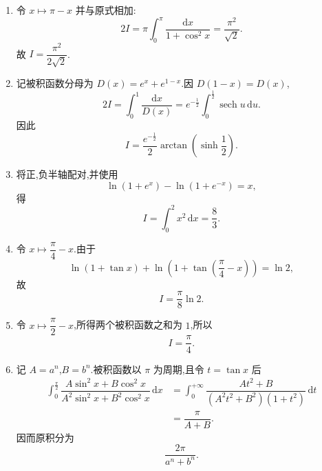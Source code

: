 \begin{solution}
    \leavevmode
    \begin{enumerate}
        \item 令 $x\mapsto\pi-x$ 并与原式相加:
              \[
                  2I=\pi\int_0^\pi\dfrac{\mathrm{d}x}{1+\cos^2x}
                  =\dfrac{\pi^2}{\sqrt2}.
              \]
              故 $I=\boxed{\dfrac{\pi^2}{2\sqrt2}}$.

        \item 记被积函数分母为 $D(x)=e^x+e^{1-x}$.因 $D(1-x)=D(x)$,
              \[
                  2I=\int_0^1\dfrac{\mathrm{d}x}{D(x)}
                  =e^{-\frac{1}{2}}\int_0^{\frac{1}{2}}\operatorname{sech}u\,\mathrm{d}u.
              \]
              因此
              \[
                  I=\boxed{\dfrac{e^{-\frac{1}{2}}}{2}
                      \arctan\left(\sinh\dfrac{1}{2}\right)}.
              \]

        \item 将正,负半轴配对,并使用
              \[
                  \ln(1+e^x)-\ln(1+e^{-x})=x,
              \]
              得
              \[
                  I=\int_0^2x^2\,\mathrm{d}x=\boxed{\dfrac{8}{3}}.
              \]

        \item 令 $x\mapsto\dfrac{\pi}{4}-x$.由于
              \[
                  \ln(1+\tan x)
                  +\ln\left(1+\tan\left(\dfrac{\pi}{4}-x\right)\right)=\ln2,
              \]
              故
              \[
                  I=\boxed{\dfrac{\pi}{8}\ln2}.
              \]

        \item 令 $x\mapsto\dfrac{\pi}{2}-x$,所得两个被积函数之和为 $1$,所以
              \[
                  I=\boxed{\dfrac{\pi}{4}}.
              \]

        \item 记 $A=a^n$,$B=b^n$.被积函数以 $\pi$ 为周期,且令 $t=\tan x$ 后
              \[
                  \begin{aligned}
                      \int_0^{\frac{\pi}{2}}
                      \dfrac{A\sin^2x+B\cos^2x}
                      {A^2\sin^2x+B^2\cos^2x}\,\mathrm{d}x
                       & =\int_0^{+\infty}
                      \dfrac{At^2+B}{(A^2t^2+B^2)(1+t^2)}\,\mathrm{d}t \\
                       & =\dfrac{\pi}{A+B}.
                  \end{aligned}
              \]
              因而原积分为
              \[
                  \boxed{\dfrac{2\pi}{a^n+b^n}}.
              \]
    \end{enumerate}
\end{solution}

